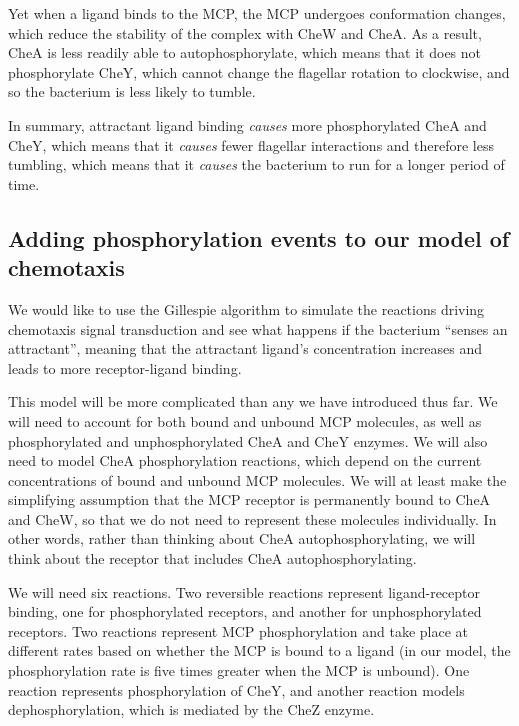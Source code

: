 Yet when a ligand binds to the MCP, the MCP undergoes conformation changes, which reduce the stability of the complex with CheW and CheA. As a result, CheA is less readily able to autophosphorylate, which means that it does not phosphorylate CheY, which cannot change the flagellar rotation to clockwise, and so the bacterium is less likely to tumble.

In summary, attractant ligand binding \textit{causes} more phosphorylated CheA and CheY, which means that it \textit{causes} fewer flagellar interactions and therefore less tumbling, which means that it \textit{causes} the bacterium to run for a longer period of time.\\

\begin{note}\end{note}


\FloatBarrier
{}
\subsection{Adding phosphorylation events to our model of chemotaxis}

We would like to use the Gillespie algorithm to simulate the reactions driving chemotaxis signal transduction and see what happens if the bacterium ``senses an attractant'', meaning that the attractant ligand's concentration increases and leads to more receptor-ligand binding.

This model will be more complicated than any we have introduced thus far. We will need to account for both bound and unbound MCP molecules, as well as phosphorylated and unphosphorylated CheA and CheY enzymes. We will also need to model CheA phosphorylation reactions, which depend on the current concentrations of bound and unbound MCP molecules. We will at least make the simplifying assumption that the MCP receptor is permanently bound to CheA and CheW, so that we do not need to represent these molecules individually. In other words, rather than thinking about CheA autophosphorylating, we will think about the receptor that includes CheA autophosphorylating.

We will need six reactions. Two reversible reactions represent ligand-receptor binding, one for phosphorylated receptors, and another for unphosphorylated receptors. Two reactions represent MCP phosphorylation and take place at different rates based on whether the MCP is bound to a ligand (in our model, the phosphorylation rate is five times greater when the MCP is unbound). One reaction represents phosphorylation of CheY, and another reaction models dephosphorylation, which is mediated by the CheZ enzyme.

